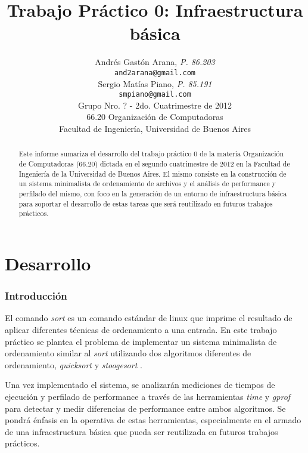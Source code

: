 \documentclass[a4paper,11pt]{article}
\title{\textbf{Trabajo Práctico 0: Infraestructura básica}}
\author{
  Andrés Gastón Arana, \textit{P. 86.203}                          \\
  \texttt{and2arana@gmail.com}                                     \\
  Sergio Matías Piano, \textit{P. 85.191}                          \\
  \texttt{smpiano@gmail.com}                                       \\ [2.5ex]
  \normalsize{Grupo Nro. ? - 2do. Cuatrimestre de 2012}            \\
  \normalsize{66.20 Organización de Computadoras}                  \\
  \normalsize{Facultad de Ingeniería, Universidad de Buenos Aires}
}
\date{}
\begin{document}
\thispagestyle{empty}
\maketitle

\begin{abstract}

  Este informe sumariza el desarrollo del trabajo práctico 0 de la materia
  Organización de Computadoras (66.20) dictada en el segundo cuatrimestre de
  2012 en la Facultad de Ingeniería de la Universidad de Buenos Aires. El mismo
  consiste en la construcción de un sistema minimalista de ordenamiento de
  archivos y el análisis de performance y perfilado del mismo, con foco en la
  generación de un entorno de infraestructura básica para soportar el
  desarrollo de estas tareas que será reutilizado en futuros trabajos
  prácticos.

\end{abstract}

\clearpage

\tableofcontents
\clearpage


\part{Desarrollo}

\section{Introducción}

El comando \textit{sort} \cite{WIKISORT} es un comando estándar de linux que
imprime el resultado de aplicar diferentes técnicas de ordenamiento a una
entrada. En este trabajo práctico se plantea el problema de implementar un
sistema minimalista de ordenamiento similar al \textit{sort} utilizando dos
algoritmos diferentes de ordenamiento, \textit{quicksort} \cite{WIKIQS} y
\textit{stoogesort} \cite{WIKIST}.

Una vez implementado el sistema, se analizarán mediciones de tiempos de
ejecución y perfilado de performance a través de las herramientas \textit{time}
\cite{WIKITIME} y \textit{gprof} \cite{GPROF} para detectar y medir diferencias
de performance entre ambos algoritmos. Se pondrá énfasis en la operativa de
estas herramientas, especialmente en el armado de una infraestructura básica
que pueda ser reutilizada en futuros trabajos prácticos.
\end{document}
